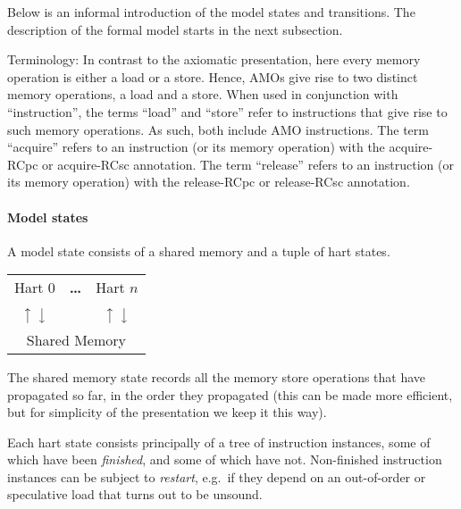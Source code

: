 



Below is an informal introduction of the model states and transitions.
The description of the formal model starts in the next subsection.


Terminology: In contrast to the axiomatic presentation, here every memory operation is either a load or a store.
Hence, AMOs give rise to two distinct memory operations, a load and a store.
When used in conjunction with ``instruction'', the terms ``load'' and ``store'' refer to instructions that give rise to such memory operations.
As such, both include AMO instructions.
The term ``acquire'' refers to an instruction (or its memory operation) with the acquire-RCpc or acquire-RCsc annotation.
The term ``release'' refers to an instruction (or its memory operation) with the release-RCpc or release-RCsc annotation.

\paragraph{Model states}
A model state consists of a shared memory and a tuple of hart states.
\begin{center}
\sffamily
\begin{tabular}{ccc}
\cline{1-1}\cline{3-3}
\multicolumn{1}{|c|}{Hart 0} & \bf \dots & \multicolumn{1}{|c|}{Hart $n$} \\
\cline{1-1}\cline{3-3}
$\big\uparrow$ $\big\downarrow$ & & $\big\uparrow$ $\big\downarrow$ \\
\hline
\multicolumn{3}{|c|}{Shared Memory} \\
\hline
\end{tabular}
\end{center}
The shared memory state records all the memory store operations that have propagated so far, in the order they propagated (this can be made more efficient, but for simplicity of the presentation we keep it this way).

Each hart state consists principally of a tree of instruction instances, some of which have been \emph{finished}, and some of which have not.
Non-finished instruction instances can be subject to \emph{restart}, e.g.~if they depend on an out-of-order or speculative load that turns out to be unsound.

